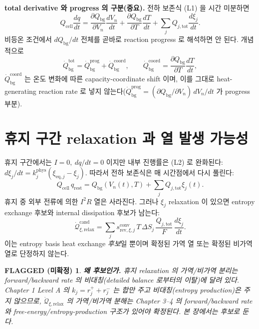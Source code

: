 \documentclass[11pt,a4paper]{article}
\newtheorem*{flagbox}{FLAGGED (미확정)}
\newcommand{\eq}{\mathrm{eq}}
\newcommand{\tot}{\mathrm{tot}}
\newcommand{\bg}{\mathrm{bg}}
\newcommand{\cell}{\mathrm{cell}}
\newcommand{\rev}{\mathrm{rev}}
\newcommand{\rlx}{\mathrm{relax}}
\newcommand{\prog}{\mathrm{prog}}
\newcommand{\coord}{\mathrm{coord}}
\newcommand{\cand}{\mathrm{cand}}
\newcommand{\conv}{\mathrm{conv}}
\begin{document}
\textbf{total derivative 와 progress 의 구분(중요).} 전하 보존식 (L1) 을 시간 미분하면
\begin{equation}
Q_\cell\frac{dq}{dt}=\frac{\partial Q_\bg}{\partial V_n}\frac{dV_n}{dt}+\frac{\partial Q_\bg}{\partial T}\frac{dT}{dt}
+\sum_jQ_{j,\tot}\frac{d\xi_j}{dt}.
\label{eq:ch2_dQdt}
\end{equation}
비등온 조건에서 $dQ_\bg/dt$ 전체를 곧바로 reaction progress 로 해석하면 안 된다. 개념적으로
\begin{equation}
\dot Q_\bg^{\mathrm{tot}}=\dot Q_\bg^{\prog}+\dot Q_\bg^{\coord},\qquad
\dot Q_\bg^{\coord}=\frac{\partial Q_\bg}{\partial T}\frac{dT}{dt},
\label{eq:ch2_bgsplit}
\end{equation}
$\dot Q_\bg^{\coord}$ 는 온도 변화에 따른 capacity-coordinate shift 이며, 이를 그대로 heat-generating
reaction rate 로 넣지 않는다($\dot Q_\bg^{\prog}=(\partial Q_\bg/\partial V_n)\,dV_n/dt$ 가 progress 부분).

\section{휴지 구간 relaxation 과 열 발생 가능성}\label{sec:ch2_rest}
휴지 구간에서는 $I=0,\ dq/dt=0$ 이지만 내부 진행률은 (L2) 로 완화된다:
$d\xi_j/dt=k_j^{\mathrm{phys}}(\xi_{\eq,j}-\xi_j)$. 따라서 전하 보존식은 매 시간점에서 다시 풀린다:
\begin{equation}
Q_\cell\,q_{\mathrm{rest}}=Q_\bg(V_n(t),T)+\sum_jQ_{j,\tot}\xi_j(t).
\label{eq:ch2_rest_balance}
\end{equation}
휴지 중 외부 전류에 의한 $I^2R$ 열은 사라진다. 그러나 $\xi_j$ relaxation 이 있으면 entropy exchange 후보와
internal dissipation 후보가 남는다:
\begin{equation}
\dot{\mathcal Q}_{\xi,\rlx}^{\cand}=\sum_js_{\rev,\xi,j}^{\conv}\,T\,\Delta S_j\,\frac{Q_{j,\tot}}{F}\,\frac{d\xi_j}{dt}.
\label{eq:ch2_relax}
\end{equation}
이는 entropy basis heat exchange \emph{후보}일 뿐이며 확정된 가역 열 또는 확정된 비가역 열로 단정하지 않는다.
\begin{flagbox}
\textbf{왜 후보인가.} 휴지 relaxation 의 가역/비가역 분리는 forward/backward rate 의 비대칭(detailed balance
로부터의 이탈)에 달려 있다. Chapter 1 Level A 의 $k_j=r_j^++r_j^-$ 는 \emph{합}만 주고 비대칭(entropy
production)은 주지 않으므로, $\dot{\mathcal Q}_{\xi,\rlx}$ 의 가역/비가역 분해는 Chapter 3--4 의
forward/backward rate 와 free-energy/entropy-production 구조가 있어야 확정된다. 본 장에서는 후보로 둔다.
\end{flagbox}
\end{document}
